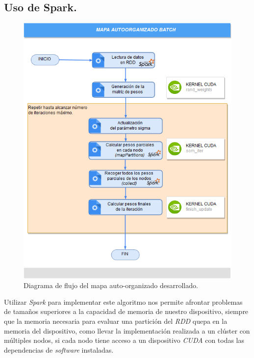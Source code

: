 \subsection{Uso de Spark.}
\begin{figure}[ht]
\centering
\includegraphics[scale=0.39]{imagenes/flujosparksom.png}
\caption{Diagrama de flujo del mapa auto-organizado desarrollado.}
\label{image:flujosparksom}
\end{figure}

Utilizar \textit{Spark} para implementar este algoritmo nos permite afrontar problemas de tamaños superiores a la capacidad de memoria de nuestro dispositivo, siempre que la memoria necesaria para evaluar una partición del \textit{RDD} quepa en la memoria del dispositivo, como llevar la implementación realizada a un clúster con múltiples nodos, si cada nodo tiene acceso a un dispositivo \textit{CUDA} con todas las dependencias de \textit{software} instaladas.\\


